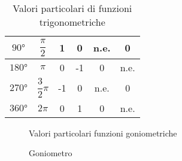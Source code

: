 \begin{table}[H]
\begin{tabular}{cccccc}
		\hline%
		$\ang{90}$&$\dfrac{\pi}{2}$&1&0&n.e.&0\\ [.25cm]
		\hline%
		$\ang{180}$&$\pi$&0&-1& 0 &n.e.\\ [.25cm]
		\hline%
		$\ang{270}$&$\dfrac{3}{2}\pi$&-1&0&n.e.&0\\ [.25cm]
		\hline%
		$\ang{360}$&$2\pi$&0&1&0&n.e.\\ [.25cm]
		\bottomrule
	\end{tabular}
	\caption{Valori particolari di funzioni trigonometriche}
	\label{tab:ValoriParticolariUzioniTrigonometriche}
\end{table}
\begin{figure}
	\centering

	\caption{Valori particolari funzioni goniometriche}
		\label{fig:ValoriParticolariUzioniTrigonometriche2}
\end{figure}
\begin{figure}
	
	\caption{Goniometro}
	\label{fig:Goniometrotkz}
\end{figure}